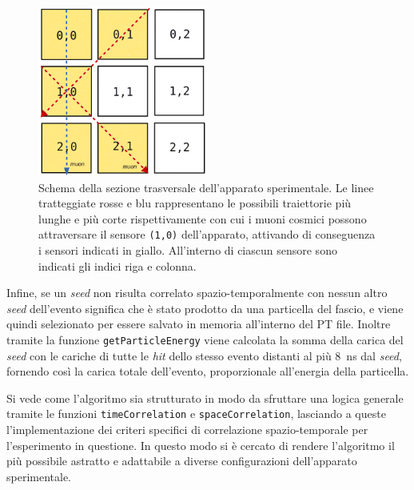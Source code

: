 \documentclass[../main.tex]{subfiles}
\begin{document}


\begin{figure}[tb]
	\centering
	\includegraphics[width=0.5\textwidth]{3x3_side_indexes.png}
	\caption{Schema della sezione trasversale dell'apparato sperimentale. Le linee tratteggiate rosse e blu rappresentano le possibili traiettorie più lunghe e più corte rispettivamente con cui i muoni cosmici possono attraversare il sensore \texttt{(1,0)} dell'apparato, attivando di conseguenza i sensori indicati in giallo. All'interno di ciascun sensore sono indicati gli indici riga e colonna.}
	\label{fig:3x3_sketch}
\end{figure}

Infine, se un \emph{seed} non risulta correlato spazio-temporalmente con nessun altro \emph{seed} dell'evento significa che è stato prodotto da una particella del fascio, e viene quindi selezionato per essere salvato in memoria all'interno del PT file. 
Inoltre tramite la funzione \texttt{getParticleEnergy} viene calcolata la somma della carica del \emph{seed} con le cariche di tutte le \emph{hit} dello stesso evento distanti al più \SI{8}{\ns} dal \emph{seed}, fornendo così la carica totale dell'evento, proporzionale all'energia della particella.

Si vede come l'algoritmo sia strutturato in modo da sfruttare una logica generale tramite le funzioni \texttt{timeCorrelation} e \texttt{spaceCorrelation}, lasciando a queste l'implementazione dei criteri specifici di correlazione spazio-temporale per l'esperimento in questione. In questo modo si è cercato di rendere l'algoritmo il più possibile astratto e adattabile a diverse configurazioni dell'apparato sperimentale.
\end{document}
